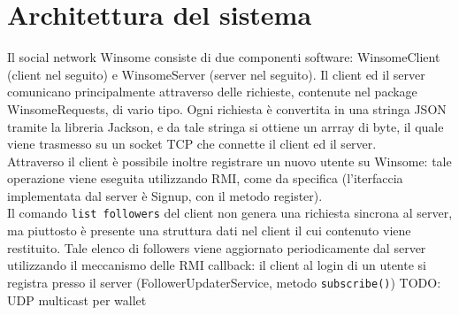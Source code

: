 \section{Architettura del sistema}
Il social network Winsome consiste di due componenti software: WinsomeClient (client nel seguito)
 e WinsomeServer (server nel seguito). Il client ed il server comunicano principalmente 
 attraverso delle richieste, contenute nel package WinsomeRequests, di vario tipo. 
 Ogni richiesta è convertita in una stringa JSON tramite la libreria Jackson, e da 
 tale stringa si ottiene un arrray di byte, il quale viene trasmesso su un socket TCP che connette
 il client ed il server.\\
 Attraverso il client è possibile inoltre registrare un nuovo utente su Winsome: tale operazione 
 viene eseguita utilizzando RMI, come da specifica (l'iterfaccia implementata dal server è Signup, 
 con il metodo register).\\
 Il comando \verb|list followers| del client non genera una richiesta sincrona al server, ma piuttosto
 è presente una struttura dati nel client il cui contenuto viene restituito. Tale elenco di followers
 viene aggiornato periodicamente dal server utilizzando il meccanismo delle RMI callback:
 il client al login di un utente si registra presso il server (FollowerUpdaterService, metodo \verb|subscribe()|)
TODO: UDP multicast per wallet